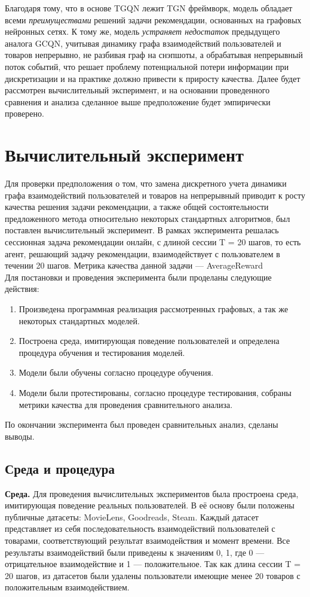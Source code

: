 \documentclass[a4paper,14pt,oneside]{mipt-thesis-ms}
\begin{document}
Благодаря тому, что в основе TGQN лежит TGN фреймворк, модель обладает всеми {\it преимуществами} решений задачи рекомендации, основанных на графовых нейронных сетях. К тому же, модель {\it устраняет недостаток} предыдущего аналога GCQN, учитывая динамику графа взаимодействий пользователей и товаров непрерывно, не разбивая граф на снэпшоты, а обрабатывая непрерывный поток событий, что решает проблему потенциальной потери информации при дискретизации и на практике должно привести к приросту качества. Далее будет рассмотрен вычислительный эксперимент, и на основании проведенного сравнения и анализа сделанное выше предположение будет эмпирически проверено.

\chapter{Вычислительный эксперимент}
Для проверки предположения о том, что замена дискретного учета динамики графа взаимодействий пользователей и товаров на непрерывный приводит к росту качества решения задачи рекомендации, а также общей состоятельности предложенного метода относительно некоторых стандартных алгоритмов, был поставлен вычислительный эксперимент. В рамках эксперимента решалась сессионная задача рекомендации онлайн, с длиной сессии T = 20 шагов, то есть агент, решающий задачу рекомендации, взаимодействует с пользователем в течении 20 шагов. Метрика качества данной задачи --- AverageReward\\

Для постановки и проведения эксперимента были проделаны следующие действия:
\begin{enumerate}
\item Произведена программная реализация рассмотренных графовых, а так же некоторых стандартных моделей.
\item Построена среда, имитирующая поведение пользователей и определена процедура обучения и тестирования моделей.
\item Модели были обучены согласно процедуре обучения.
\item Модели были протестированы, согласно процедуре тестирования, собраны метрики качества для проведения сравнительного анализа.
\end{enumerate}

По окончании эксперимента был проведен сравнительных анализ, сделаны выводы.

\section{Среда и процедура}
{\bf Среда.} Для проведения вычислительных экспериментов была простроена среда, имитирующая поведение реальных пользователей. В её основу были положены публичные датасеты: MovieLens, Goodreads, Steam. Каждый датасет представляет из себя последовательность взаимодействий пользователей с товарами, соответствующий результат взаимодействия и момент времени. Все результаты взаимодействий были приведены к значениям {0, 1}, где 0 --- отрицательное взаимодействие и 1 --- положительное. Так как длина сессии T = 20 шагов, из датасетов были удалены пользователи имеющие менее 20 товаров с положительным взаимодействием.\\
\end{document}

